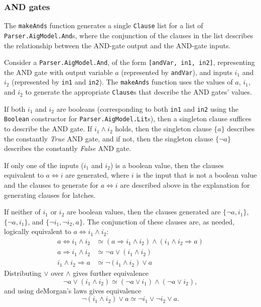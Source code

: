 \documentclass[12pt,a4paper,twoside,openright]{report}
\begin{document}
{\subsubsection{AND gates}
The \verb,makeAnds, function generates a single \verb,Clause, list for a list of \verb,Parser.AigModel.And,s,
where the conjunction of the clauses in the list describes the relationship between the AND-gate output
and the AND-gate inputs.

Consider a \verb,Parser.AigModel.And,, of the form \verb.[andVar, in1, in2]., representing the AND gate
with output variable $a$ (represented by \verb,andVar,), and inputs $i_1$ and $i_2$ (represented by \verb,in1,
and \verb,in2,). The \verb,makeAnds, function uses the values of $a$, $i_1$, and $i_2$ to generate the appropriate
\verb,Clause,s that describe the AND gates' values.

If both $i_1$ and $i_2$ are booleans (corresponding to both \verb,in1, and \verb,in2, using the \verb,Boolean,
constructor for \verb,Parser.AigModel.Lit,s), then a singleton clause suffices to describe the AND gate.
If $i_1 \wedge i_2$ holds, then the singleton clause $\{a\}$ describes the constantly {\it True} AND gate,
and if not, then the singleton clause $\{\neg a\}$ describes the constantly {\it False} AND gate.

If only one of the inputs ($i_1$ and $i_2$) is a boolean value, then the clauses equivalent to $a \Leftrightarrow i$
are generated, where $i$ is the input that is not a boolean value and the clauses to generate for $a \Leftrightarrow i$ 
are described above in the explanation for generating clauses for latches.

If neither of $i_1$ or $i_2$ are boolean values, then the clauses generated are
$\{\neg a, i_1\}$, $\{\neg a, i_1\}$, and
$\{\neg i_1,\neg i_2, a\}$. The conjunction of these clauses are, as needed,
logically equivalent to $a \Leftrightarrow i_1 \wedge i_2$:
\begin{align*}
a \Leftrightarrow i_1 \wedge i_2 &\simeq (a \Rightarrow i_1 \wedge i_2) \wedge (i_1 \wedge i_2 \Rightarrow a)\\
a \Rightarrow i_1 \wedge i_2 &\simeq \neg a \vee (i_1 \wedge i_2)\\
i_1 \wedge i_2 \Rightarrow a &\simeq \neg (i_1 \wedge i_2) \vee a
\end{align*}
Distributing $\vee$ over $\wedge$ gives further equivalence
$$\neg a \vee (i_1 \wedge i_2) \simeq
(\neg a \vee i_1) \wedge (\neg a \vee i_2),$$
and using deMorgan's laws gives equivalence
$$\neg (i_1 \wedge i_2) \vee a \simeq
\neg i_1 \vee \neg i_2 \vee a.$$

}
\end{document}
